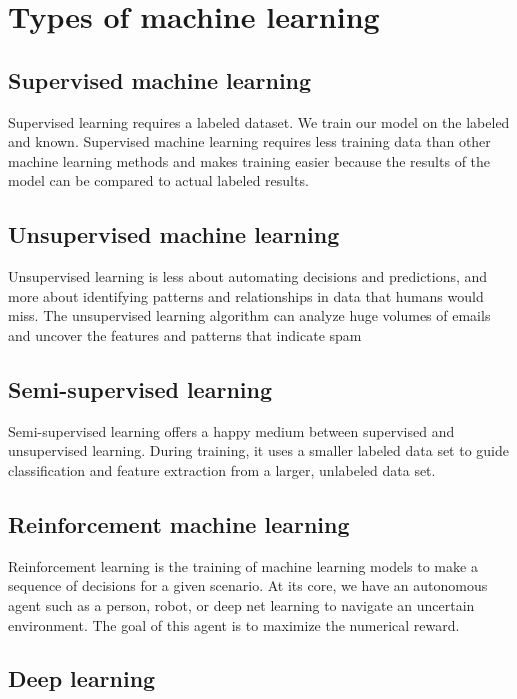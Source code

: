 \documentclass[a4paper,oneside,openright,11pt]{book}
\begin{document}
\section{Types of machine learning}

\subsection{Supervised machine learning}

Supervised learning requires a labeled dataset. We train our model on the labeled and known. Supervised machine learning requires less training data than other machine learning methods and makes training easier because the results of the model can be compared to actual labeled results.



\subsection{Unsupervised machine learning}

Unsupervised learning is less about automating decisions and predictions, and more about identifying patterns and relationships in data that humans would miss. The unsupervised learning algorithm can analyze huge volumes of emails and uncover the features and patterns that indicate spam 

\subsection{Semi-supervised learning }

Semi-supervised learning offers a happy medium between supervised and unsupervised learning. During training, it uses a smaller labeled data set to guide classification and feature extraction from a larger, unlabeled data set.

\subsection{Reinforcement machine learning}

Reinforcement learning is the training of machine learning models to make a sequence of decisions for a given scenario.
At its core, we have an autonomous agent such as a person, robot, or deep net learning to navigate an uncertain environment. The goal of this agent is to maximize the numerical reward.


\subsection{Deep learning}
\end{document}
